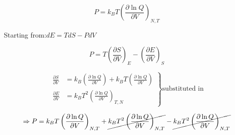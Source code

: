 \documentclass{article}
\begin{document}
\begin{flushleft}

\vspace*{0.2cm}

\begin{equation*}
P = k_B T \left( \frac{\partial \ln Q}{\partial V} \right)_{N,T}
\end{equation*}

\vspace{0.3cm}
Starting from:\quad $dE = T dS - P dV$

\begin{equation*}
P = T \left(\frac{\partial S}{\partial V}\right)_E - \left(\frac{\partial E}{\partial V}\right)_S
\end{equation*}

\vspace{0.2cm}
\begin{equation*}
\left.
\begin{aligned}
\frac{\partial S}{\partial V} &= k_B \left( \frac{\partial \ln Q}{\partial V} \right) + k_B T \left( \frac{\partial \ln Q}{\partial V} \right) \\[6pt]
\frac{\partial E}{\partial V} &= k_B T^2 \left( \frac{\partial \ln Q}{\partial V} \right)_{T,N}
\end{aligned}
\right\} \text{substituted in}
\end{equation*}

\vspace{0.2cm}
\begin{equation*}
\Rightarrow P = k_B T \left( \frac{\partial \ln Q}{\partial V} \right)_{N,T} + \cancel{k_B T^2 \left( \frac{\partial \ln Q}{\partial V} \right)_{N,T}} - \cancel{k_B T^2 \left( \frac{\partial \ln Q}{\partial V} \right)_{N,T}}
\end{equation*}

\vspace{0.2cm}




\end{flushleft}
\end{document}
